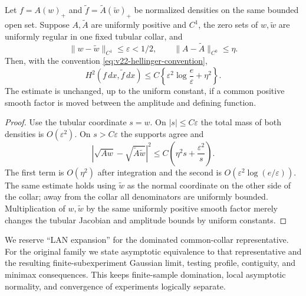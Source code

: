 \begin{lemma}
\label{lem:v22-hypersurface-stability}
Let $f=A(w)_+$ and $\widetilde f=\widetilde A(\widetilde w)_+$ be normalized
densities on the same bounded open set.  Suppose $A,\widetilde A$ are
uniformly positive and $C^1$, the zero sets of $w,\widetilde w$ are uniformly
regular in one fixed tubular collar, and
\[
 \|w-\widetilde w\|_{C^1}\le\varepsilon<1/2,
 \qquad
 \|A-\widetilde A\|_{C^0}\le\eta.
\]
Then, with the convention \eqref{eq:v22-hellinger-convention},
\begin{equation}\label{eq:v22-hypersurface-stability}
 H^2(f\,dx,\widetilde f\,dx)
 \le C\left\{\varepsilon^2\log\frac e\varepsilon+\eta^2\right\}.
\end{equation}
The estimate is unchanged, up to the uniform constant, if a common positive
smooth factor is moved between the amplitude and defining function.
\end{lemma}

\begin{proof}
Use the tubular coordinate $s=w$.  On $|s|\le C\varepsilon$ the total mass of
both densities is $O(\varepsilon^2)$.  On $s>C\varepsilon$ the supports agree
and
\[
 |\sqrt{Aw}-\sqrt{\widetilde A\widetilde w}|^2
 \le C\left(\eta^2s+\frac{\varepsilon^2}{s}\right).
\]
The first term is $O(\eta^2)$ after integration and the second is
$O(\varepsilon^2\log(e/\varepsilon))$.  The same estimate holds using
$\widetilde w$ as the normal coordinate on the other side of the collar;
away from the collar all denominators are uniformly bounded.  Multiplication
of $w,\widetilde w$ by the same uniformly positive smooth factor merely
changes the tubular Jacobian and amplitude bounds by uniform constants.
\end{proof}

\begin{remark}[Terminology]
We reserve ``LAN expansion'' for the dominated common-collar representative.
For the original family we state asymptotic equivalence to that representative
and the resulting finite-subexperiment Gaussian limit, testing profile,
contiguity, and minimax consequences.  This keeps finite-sample domination,
local asymptotic normality, and convergence of experiments logically
separate.
\end{remark}
